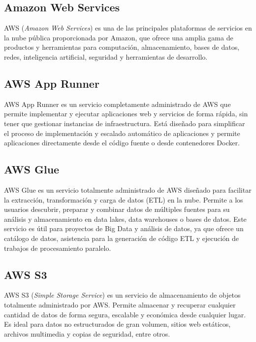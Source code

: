 \subsection{Amazon Web Services}

AWS (\textit{Amazon Web Services}) \citep{aws}  es una de las principales plataformas de servicios en la nube pública proporcionada por Amazon, que ofrece una amplia gama de productos y herramientas para computación, almacenamiento, bases de datos, redes, inteligencia artificial, seguridad y herramientas de desarrollo.


\subsection{AWS App Runner}

AWS App Runner \citep{aws_app_runner} es un servicio completamente administrado de AWS que permite implementar y ejecutar aplicaciones web y servicios de forma rápida, sin tener que gestionar instancias de infraestructura. Está diseñado para simplificar el proceso de implementación y escalado automático de aplicaciones y permite aplicaciones directamente desde el código fuente o desde contenedores Docker.



\subsection{AWS Glue}

AWS Glue \citep{aws_glue} es un servicio totalmente administrado de AWS diseñado para facilitar la extracción, transformación y carga de datos (ETL) en la nube. Permite a los usuarios descubrir, preparar y combinar datos de múltiples fuentes para su análisis y almacenamiento en data lakes, data warehouses o bases de datos. Este servicio es útil para proyectos de Big Data y análisis de datos, ya que ofrece un catálogo de datos, asistencia para la generación de código ETL y ejecución de trabajos de procesamiento paralelo.



\subsection{AWS S3}

AWS S3 (\textit{Simple Storage Service}) \citep{aws_s3} es un servicio de almacenamiento de objetos totalmente administrado por AWS. Permite almacenar y recuperar cualquier cantidad de datos de forma segura, escalable y económica desde cualquier lugar. Es ideal para datos no estructurados de gran volumen, sitios web estáticos, archivos multimedia y copias de seguridad, entre otros.


